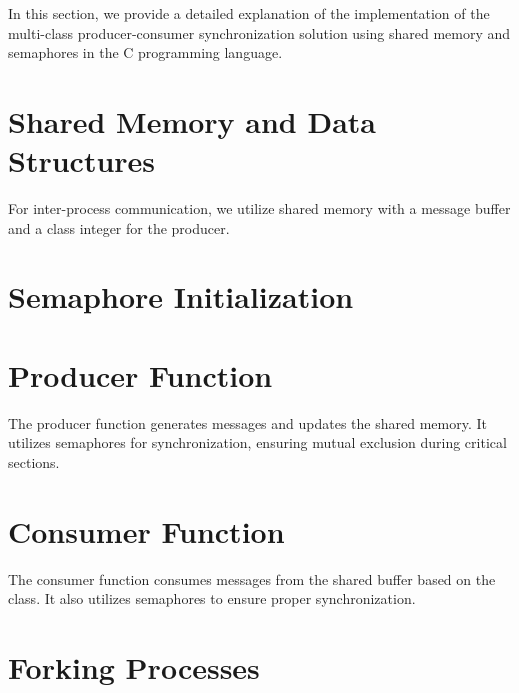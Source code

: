 

\lstset{style=xcodestyle}


In this section, we provide a detailed explanation 
of the implementation of the multi-class producer-consumer synchronization solution 
using shared memory and semaphores in the C programming language.

\section{Shared Memory and Data Structures}

For inter-process communication, 
we utilize shared memory with a message buffer and a class integer for the producer.



\section{Semaphore Initialization}



\section{Producer Function}

The producer function generates messages and updates the shared memory. 
It utilizes semaphores for synchronization, 
ensuring mutual exclusion during critical sections.



\section{Consumer Function}

The consumer function consumes messages from the shared buffer based on the class. 
It also utilizes semaphores to ensure proper synchronization.



\section{Forking Processes}

